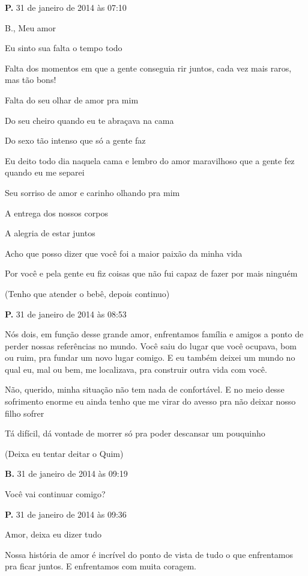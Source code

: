 {\parindent0pt\parskip1pt\raggedright

\textbf{P.} 31 de janeiro de 2014 às 07:10

B., Meu amor

Eu sinto sua falta o tempo todo

Falta dos momentos em que a gente conseguia rir juntos, cada vez mais
raros, mas tão bons!

Falta do seu olhar de amor pra mim

Do seu cheiro quando eu te abraçava na cama

Do sexo tão intenso que só a gente faz

Eu deito todo dia naquela cama e lembro do amor maravilhoso que a gente
fez quando eu me separei

Seu sorriso de amor e carinho olhando pra mim

A entrega dos nossos corpos

A alegria de estar juntos

Acho que posso dizer que você foi a maior paixão da minha vida

Por você e pela gente eu fiz coisas que não fui capaz de fazer por mais
ninguém

(Tenho que atender o bebê, depois continuo)

\textbf{P.} 31 de janeiro de 2014 às 08:53

Nós dois, em função desse grande amor, enfrentamos família e amigos a
ponto de perder nossas referências no mundo. Você saiu do lugar que você
ocupava, bom ou ruim, pra fundar um novo lugar comigo. E eu também
deixei um mundo no qual eu, mal ou bem, me localizava, pra construir
outra vida com você.

Não, querido, minha situação não tem nada de confortável. E no meio
desse sofrimento enorme eu ainda tenho que me virar do avesso pra não
deixar nosso filho sofrer

Tá difícil, dá vontade de morrer só pra poder descansar um pouquinho

(Deixa eu tentar deitar o Quim)

\textbf{B.} 31 de janeiro de 2014 às 09:19

Você vai continuar comigo?

\textbf{P.} 31 de janeiro de 2014 às 09:36

Amor, deixa eu dizer tudo

Nossa história de amor é incrível do ponto de vista de tudo o que
enfrentamos pra ficar juntos. E enfrentamos com muita coragem.

}
